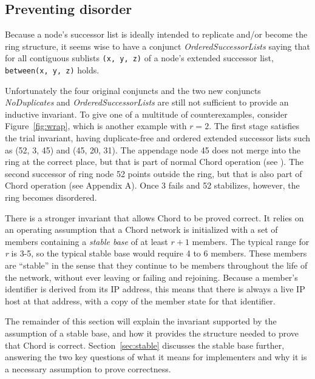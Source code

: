 \documentclass[conference]{IEEEtran}
\begin{document}
\subsection{Preventing disorder}
\label{sec:disorder}

Because a node's successor list is ideally intended to replicate
and/or become the ring structure, it seems wise to have
a conjunct
{\it OrderedSuccessorLists} saying that
for all contiguous sublists
\small
{\tt (x, y, z)}
\normalsize
of
a node's extended successor list,
\small
{\tt between(x, y, z)}
\normalsize
holds.

Unfortunately the four original conjuncts and the two new conjuncts
{\it NoDuplicates} and {\it OrderedSuccessorLists}
are still not
sufficient to provide an inductive invariant.
To give one of a multitude of counterexamples, consider
Figure~\ref{fig:wrap}, which is another example with $r = 2$.
The first stage satisfies the trial invariant, having duplicate-free
and ordered extended
successor lists such as (52, 3, 45) and (45, 20, 31).
The appendage node 45 does not merge into the ring at the correct
place, but that is part of normal Chord operation (see \cite{chord-ccr}).
The second successor of ring node 52 points outside the ring, but
that is also part of Chord operation (see Appendix A).
Once 3 fails and 52 stabilizes, however, 
the ring becomes disordered.

There is a stronger invariant that allows Chord to be proved correct.
It relies on an operating assumption that a Chord network is initialized
with a set of members containing a {\it stable base} of at least $r + 1$
members.
The typical range for {\it r} is 3-5, so the typical stable base would
require 4 to 6 members.
These members are ``stable'' in the sense that they continue to be
members throughout the life of the network, without ever leaving or
failing and rejoining.
Because a member's identifier is derived from its IP address, this
means that there is always a live IP host at that address, with
a copy of the member state for that identifier.

The remainder of this section will explain the invariant supported
by the assumption of a stable base, and how it provides the structure
needed to prove that Chord is correct.
Section~\ref{sec:stable} discusses the stable base further, answering
the two key questions of what it means for implementers and why it
is a necessary assumption to prove correctness.
\end{document}

